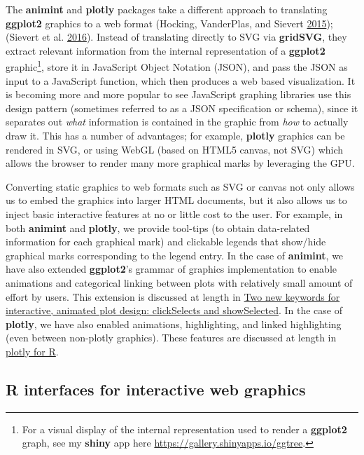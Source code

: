 \documentclass[12pt,]{isuthesis}
\let\rmarkdownfootnote\footnote%
\def\footnote{\protect\rmarkdownfootnote}
\begin{document}
The \textbf{animint} and \textbf{plotly} packages take a different
approach to translating \textbf{ggplot2} graphics to a web format
(Hocking, VanderPlas, and Sievert
\protect\hyperlink{ref-animint}{2015}); (Sievert et al.
\protect\hyperlink{ref-plotly}{2016}). Instead of translating directly
to SVG via \textbf{gridSVG}, they extract relevant information from the
internal representation of a \textbf{ggplot2} graphic\footnote{For a
  visual display of the internal representation used to render a
  \textbf{ggplot2} graph, see my \textbf{shiny} app here
  \url{https://gallery.shinyapps.io/ggtree}.}, store it in JavaScript
Object Notation (JSON), and pass the JSON as input to a JavaScript
function, which then produces a web based visualization. It is becoming
more and more popular to see JavaScript graphing libraries use this
design pattern (sometimes referred to as a JSON specification or
schema), since it separates out \emph{what} information is contained in
the graphic from \emph{how} to actually draw it. This has a number of
advantages; for example, \textbf{plotly} graphics can be rendered in
SVG, or using WebGL (based on HTML5 canvas, not SVG) which allows the
browser to render many more graphical marks by leveraging the GPU.

Converting static graphics to web formats such as SVG or canvas not only
allows us to embed the graphics into larger HTML documents, but it also
allows us to inject basic interactive features at no or little cost to
the user. For example, in both \textbf{animint} and \textbf{plotly}, we
provide tool-tips (to obtain data-related information for each graphical
mark) and clickable legends that show/hide graphical marks corresponding
to the legend entry. In the case of \textbf{animint}, we have also
extended \textbf{ggplot2}'s grammar of graphics implementation to enable
animations and categorical linking between plots with relatively small
amount of effort by users. This extension is discussed at length in
\protect\hyperlink{two-new-keywords-for-interactive-animated-plot-design-clickSelects-and-showSelected}{Two
new keywords for interactive, animated plot design: clickSelects and
showSelected}. In the case of \textbf{plotly}, we have also enabled
animations, highlighting, and linked highlighting (even between
non-plotly graphics). These features are discussed at length in
\href{https://cpsievert.github.io/plotly_book/}{plotly for R}.

\subsection{R interfaces for interactive web
graphics}\label{r-interfaces-for-interactive-web-graphics}
\end{document}
